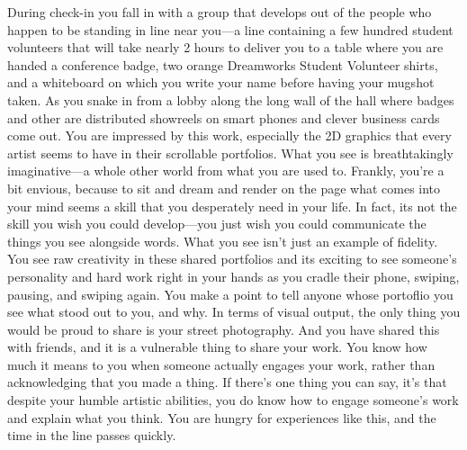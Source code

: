 \documentclass[../main.tex]{subfiles}
\begin{document}
During check-in you fall in with a group that develops out of the people who happen to be standing in line near you---a line containing a few hundred student volunteers that will take nearly 2 hours to deliver you to a table where you are handed a conference badge, two orange Dreamworks Student Volunteer shirts, and a whiteboard on which you write your name before having your mugshot taken. As you snake in from a lobby along the long wall of the hall where badges and other are distributed showreels on smart phones and clever business cards come out. You are impressed by this work, especially the 2D graphics that every artist seems to have in their scrollable portfolios. What you see is breathtakingly imaginative---a whole other world from what you are used to. Frankly, you're a bit envious, because to sit and dream and render on the page what comes into your mind seems a skill that you desperately need in your life. In fact, its not the skill you wish you could develop---you just wish you could communicate the things you see alongside words. What you see isn't just an example of fidelity. You see raw creativity in these shared portfolios and its exciting to see someone's personality and hard work right in your hands as you cradle their phone, swiping, pausing, and swiping again. You make a point to tell anyone whose portoflio you see what stood out to you, and why. In terms of visual output, the only thing you would be proud to share is your street photography. And you have shared this with friends, and it is a vulnerable thing to share your work. You know how much it means to you when someone actually engages your work, rather than acknowledging that you made a thing. If there's one thing you can say, it's that despite your humble artistic abilities, you do know how to engage someone's work and explain what you think. You are hungry for experiences like this, and the time in the line passes quickly.
\end{document}
